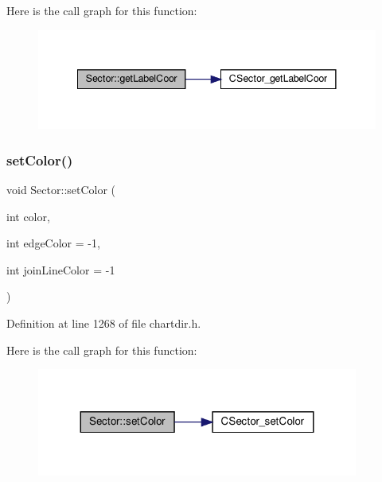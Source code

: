 Here is the call graph for this function\+:
\nopagebreak
\begin{figure}[H]
\begin{center}
\leavevmode
\includegraphics[width=341pt]{class_sector_adb9923715403a28445bfffb77a4e05a1_cgraph}
\end{center}
\end{figure}
\mbox{\label{class_sector_abefbb2367df8444cdd3ff35a92d9125c}} 
\subsubsection{\texorpdfstring{set\+Color()}{setColor()}}
{\footnotesize\ttfamily void Sector\+::set\+Color (\begin{DoxyParamCaption}\item[{int}]{color,  }\item[{int}]{edge\+Color = {\ttfamily -\/1},  }\item[{int}]{join\+Line\+Color = {\ttfamily -\/1} }\end{DoxyParamCaption})\hspace{0.3cm}{\ttfamily [inline]}}



Definition at line 1268 of file chartdir.\+h.

Here is the call graph for this function\+:
\nopagebreak
\begin{figure}[H]
\begin{center}
\leavevmode
\includegraphics[width=299pt]{class_sector_abefbb2367df8444cdd3ff35a92d9125c_cgraph}
\end{center}
\end{figure}
\mbox{\label{class_sector_ac3823667b60cbbb1ca4b632df50fc022}} 

